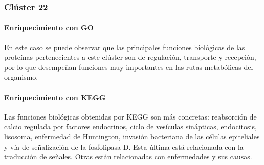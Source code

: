 \subsubsection{Clúster 22}

\paragraph{Enriquecimiento con GO}

En este caso se puede observar que las principales funciones biológicas de las proteínas pertenecientes a este clúster son de regulación, transporte y recepción, por lo que desempeñan funciones muy importantes en las rutas metabólicas del organismo. 

\paragraph{Enriquecimiento con KEGG}

Las funciones biológicas obtenidas por KEGG son más concretas: reabsorción de calcio regulada por factores endocrinos, ciclo de vesículas sinápticas, endocitosis, lisosoma, enfermedad de Huntington, invasión bacteriana de las células epiteliales y vía de señalización de la fosfolipasa D. Esta última está relacionada con la traducción de señales. Otras están relacionadas con enfermedades y sus causas.